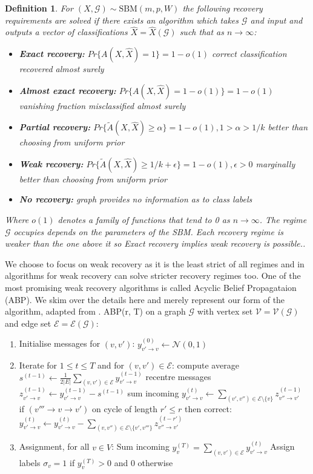 \documentclass[]{article}
\newcommand{\Gaussian}{\mathcal{N}}
\newcommand{\Gcal}{\mathcal{G}}
\newcommand{\Vcal}{\mathcal{V}}
\newcommand{\Ecal}{\mathcal{E}}
\newtheorem{definition}{Definition}[section]
\begin{document}
\begin{definition}
	For $(X, \Gcal) \sim \textrm{SBM}(m, p, W)$ the following recovery requirements are solved if there exists an algorithm which takes $\Gcal$ and input and outputs a vector of classifications $\hat{X} = \hat{X}(\Gcal)$ such that as $n \rightarrow \infty$:
	\begin{itemize}
		\item \textbf{Exact recovery:} $Pr\{A(X, \hat{X}) = 1\} = 1 - o(1)$ correct classification recovered almost surely
		\item \textbf{Almost exact recovery:} $Pr\{A(X, \hat{X}) = 1 - o(1)\} = 1 - o(1)$ vanishing fraction misclassified almost surely
		\item \textbf{Partial recovery:} $Pr\{\tilde{A}(X, \hat{X}) \geq \alpha\} = 1 - o(1), 1 > \alpha > 1/k$ better than choosing from uniform prior
		\item \textbf{Weak recovery:} $Pr\{\tilde{A}(X, \hat{X}) \geq 1/k + \epsilon \} = 1 - o(1), \epsilon > 0$ marginally better than choosing from uniform prior
		\item \textbf{No recovery:} graph provides no information as to class labels
	\end{itemize}
	Where $o(1)$ denotes a family of functions that tend to 0 as $n \rightarrow \infty$. The regime $\Gcal$ occupies depends on the parameters of the SBM. Each recovery regime is weaker than the one above it so Exact recovery implies weak recovery is possible..
\end{definition}

We choose to focus on weak recovery as it is the least strict of all regimes and in algorithms for weak recovery can solve stricter recovery regimes too. One of the most promising weak recovery algorithms is called Acyclic Belief Propagataion (ABP). We skim over the details here and merely represent our form of the algorithm, adapted from \cite{Linear-ABP}. ABP(r, T) on a graph $\Gcal$ with vertex set $\Vcal = \Vcal(\Gcal)$ and edge set $\Ecal = \Ecal(\Gcal)$:

\begin{enumerate}
	\item Initialise messages for $(v, v')$:
	\subitem $y^{(0)}_{v' \rightarrow v} \leftarrow \Gaussian(0, 1)$
	\item Iterate for $1 \leq t \leq T$ and for $(v, v') \in \Ecal$:
	\subitem compute average $s^{(t-1)} \leftarrow \frac{1}{2|E|} \sum_{(v, v') \in \Ecal} y^{(t-1)}_{v' \rightarrow v}$
	\subitem recentre messages $z^{(t-1)}_{v' \rightarrow v} \leftarrow y^{(t-1)}_{v' \rightarrow v} - s^{(t-1)}$ 
	\subitem sum incoming $y^{(t)}_{v' \rightarrow v} \leftarrow \sum_{(v', v'') \in \Ecal \setminus \{v\}}z^{(t-1)}_{v'' \rightarrow v'}$
	\subitem if $(v''' \rightarrow v \rightarrow v')$ on cycle of length $r' \leq r$ then correct:
	\subsubitem $y^{(t)}_{v' \rightarrow v} \leftarrow y^{(t)}_{v' \rightarrow v} - \sum_{(v, v'') \in \Ecal \setminus \{v', v'''\}}z^{(t-r')}_{v'' \rightarrow v'}$
	\item Assignment, for all $v \in V$:
	\subitem Sum incoming $y_v^{(T)} = \sum_{(v, v') \in \Ecal} y^{(t)}_{v' \rightarrow v}$
	\subitem Assign labels $\sigma_v = 1$ if $y_v^{(T)} > 0$ and $0$ otherwise
\end{enumerate}
\end{document}
